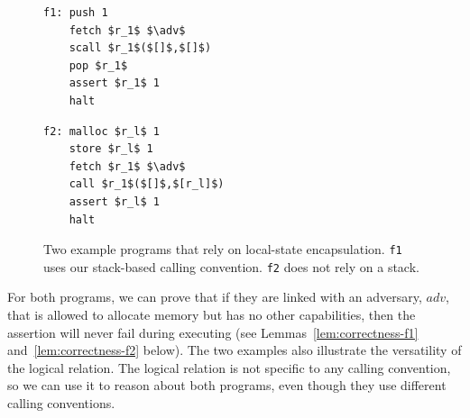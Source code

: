 \documentclass[format=acmsmall, review=false, screen=true]{acmart}
\newcommand\lau[1]{{\color{purple} \sf \footnotesize {LS: #1}}\\}
\newcommand\lars[1]{{\color{purple} \sf \footnotesize {LB: #1}}\\}
\renewcommand\lau[1]{}
\renewcommand\lars[1]{}
\newcommand{\var}[1]{\mathit{#1}}
\newcommand{\adv}{\var{adv}}
\begin{document}
\begin{figure}[t]
  \centering

  \begin{minipage}[t]{4.1cm}
  \begin{lstlisting}
f1: push 1
    fetch $r_1$ $\adv$
    scall $r_1$($[]$,$[]$)
    pop $r_1$
    assert $r_1$ 1
    halt
  \end{lstlisting}
  \end{minipage}
  \begin{minipage}[t]{4.1cm}
  \begin{lstlisting}
f2: malloc $r_l$ 1
    store $r_l$ 1
    fetch $r_1$ $\adv$
    call $r_1$($[]$,$[r_l]$)
    assert $r_l$ 1
    halt
  \end{lstlisting}
  \end{minipage}
  \caption{Two example programs that rely on local-state encapsulation. \texttt{f1} uses our stack-based calling convention. \texttt{f2} does not rely on a stack.}
  \label{fig:prog-f1-and-f2}
\end{figure}

For both programs, we can prove that if they are linked with an adversary,
$\adv$, that is allowed to allocate memory but has no other capabilities, then
the assertion will never fail during executing (see
Lemmas~\ref{lem:correctness-f1} and~\ref{lem:correctness-f2} below).
The two examples also illustrate the versatility of the logical relation.
The logical relation is not specific to any calling convention, so we can use it to reason
about both programs, even though they use different calling conventions.
\end{document}
